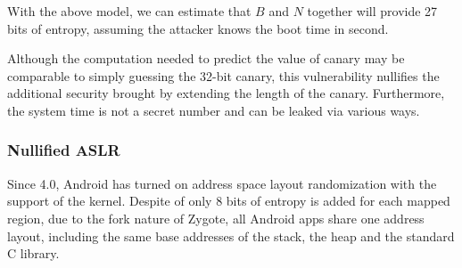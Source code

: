 With the above model, we can estimate that $B$ and $N$ together will provide 27 bits of entropy, assuming the attacker knows the boot time in second.

Although the computation needed to predict the value of canary may be comparable to simply guessing the 32-bit canary, this vulnerability nullifies the additional security brought by extending the length of the canary. Furthermore, the system time is not a secret number and can be leaked via various ways.

\subsubsection{Nullified ASLR}

Since 4.0, Android has turned on address space layout randomization with the support of the kernel. Despite of only 8 bits of entropy is added for each mapped region, due to the fork nature of Zygote, all Android apps share one address layout, including the same base addresses of the stack, the heap and the standard C library.


